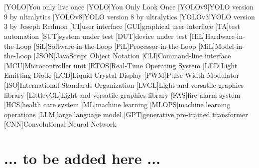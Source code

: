 \documentclass[Bachelor, BIC, english, fhCitStyle, IEEE]{BASE/twbook} %
\begin{document}
\chapter*{\listacroname}
\begin{acronym}
    [YOLO]{You only live once}
    [YOLO]{You Only Look Once}
    [YOLOv9]{YOLO version 9 by ultralytics}
    [YOLOv8]{YOLO version 8 by ultralytics}
    [YOLOv3]{YOLO version 3 by Joseph Redmon}
    [UI]{user interface} [GUI]{graphical user interface}
    [TA]{test automation} [SUT]{system under test}
    [DUT]{device under test} [HiL]{Hardware-in-the-Loop}
    [SiL]{Software-in-the-Loop} [PiL]{Processor-in-the-Loop}
    [MiL]{Model-in-the-Loop}
    [JSON]{JavaScript Object Notation}
    [CLI]{Command-line interface}
    [MCU]{Microcontroller unit}
    [RTOS]{Real-Time Operating System}
    [LED]{Light Emitting Diode}
    [LCD]{Liquid Crystal Display}
    [PWM]{Pulse Width Modulator}
    [ISO]{International Standards Organization}
    [LVGL]{Light and versatile graphics library}
    [LittlevGL]{Light and versatile graphics library}
    [FAS]{fire alarm system}
    [HCS]{health care system}
    [ML]{machine learning}
    [MLOPS]{machine learning operations}
    [LLM]{large language model}
    [GPT]{generative pre-trained transformer}
    [CNN]{Convolutional Neural Network}
\end{acronym}
\clearpage
\appendix
\chapter{... to be added here ...}
\clearpage
\end{document}
